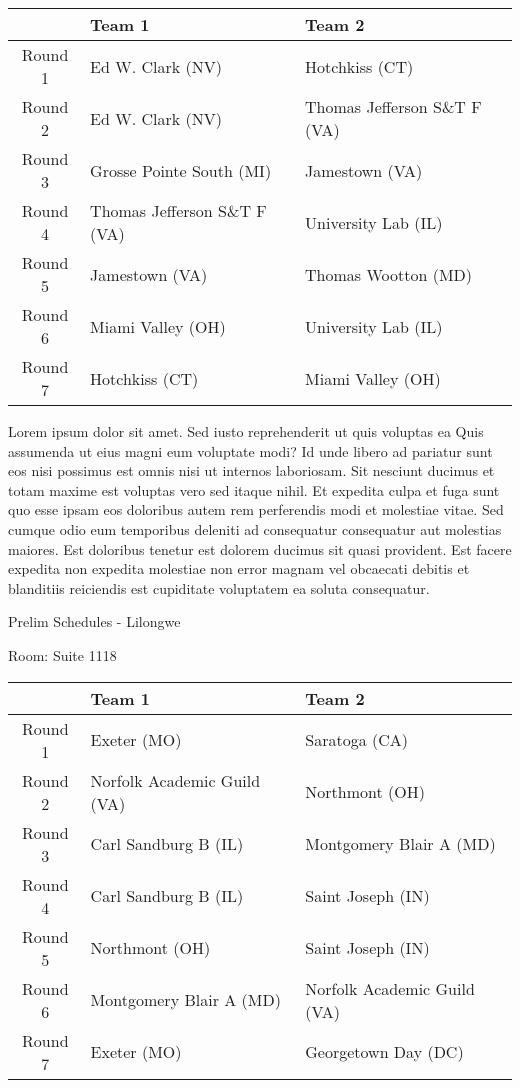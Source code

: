 \documentclass{article}%
\begin{document}
\begin{tabularx}{\textwidth}{|c|Y|Y|}%
\hline%
&Team 1&Team 2\\%
\hline%
Round 1&Ed W. Clark (NV)&Hotchkiss (CT)\\%
Round 2&Ed W. Clark (NV)&Thomas Jefferson S\&T F (VA)\\%
Round 3&Grosse Pointe South (MI)&Jamestown (VA)\\%
Round 4&Thomas Jefferson S\&T F (VA)&University Lab (IL)\\%
Round 5&Jamestown (VA)&Thomas Wootton (MD)\\%
Round 6&Miami Valley (OH)&University Lab (IL)\\%
Round 7&Hotchkiss (CT)&Miami Valley (OH)\\%
\hline%
\end{tabularx}%
\vspace*{8pt}%
\linebreak%
\newline%
Lorem ipsum dolor sit amet. Sed iusto reprehenderit ut quis voluptas ea Quis assumenda ut eius magni eum voluptate modi? Id unde libero ad pariatur sunt eos nisi possimus est omnis nisi ut internos laboriosam. Sit nesciunt ducimus et totam maxime est voluptas vero sed itaque nihil. Et expedita culpa et fuga sunt quo esse ipsam eos doloribus autem rem perferendis modi et molestiae vitae.\newline%
\newline%
Sed cumque odio eum temporibus deleniti ad consequatur consequatur aut molestias maiores. Est doloribus tenetur est dolorem ducimus sit quasi provident. Est facere expedita non expedita molestiae non error magnam vel obcaecati debitis et blanditiis reiciendis est cupiditate voluptatem ea soluta consequatur.%
\newpage%
\begin{center}%
\begin{Huge}%
Prelim Schedules {-} Lilongwe%
\end{Huge}%
\end{center}%
\begin{flushleft}%
\begin{Large}%
Room: Suite 1118%
\end{Large}%
\end{flushleft}%
\begin{tabularx}{\textwidth}{|c|Y|Y|}%
\hline%
&Team 1&Team 2\\%
\hline%
Round 1&Exeter (MO)&Saratoga (CA)\\%
Round 2&Norfolk Academic Guild (VA)&Northmont (OH)\\%
Round 3&Carl Sandburg B (IL)&Montgomery Blair A (MD)\\%
Round 4&Carl Sandburg B (IL)&Saint Joseph (IN)\\%
Round 5&Northmont (OH)&Saint Joseph (IN)\\%
Round 6&Montgomery Blair A (MD)&Norfolk Academic Guild (VA)\\%
Round 7&Exeter (MO)&Georgetown Day (DC)\\%
\hline%
\end{tabularx}%
\end{document}
